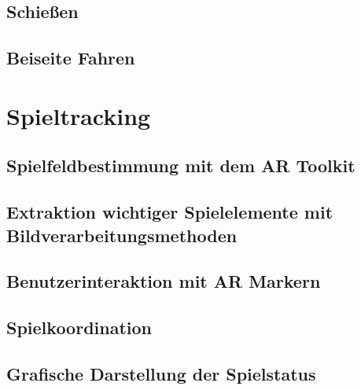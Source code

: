 \subsection{Schießen} %

\subsection{Beiseite Fahren} %

\section{Spieltracking} %

\subsection{Spielfeldbestimmung mit dem AR Toolkit} %

\subsection{Extraktion wichtiger Spielelemente mit Bildverarbeitungsmethoden} %

\subsection{Benutzerinteraktion mit AR Markern} %

\subsection{Spielkoordination} %

\subsection{Grafische Darstellung der Spielstatus} %